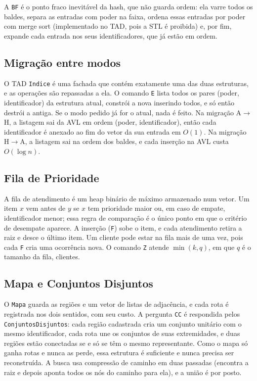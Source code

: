 \documentclass[letterpaper]{article} %
\begin{document}
A \texttt{BF} \'e o ponto fraco inevit\'avel da hash, que n\~ao guarda ordem: ela varre todos os baldes, separa as entradas com poder na faixa, ordena essas entradas por poder com merge sort (implementado no TAD, pois a STL \'e proibida) e, por fim, expande cada entrada nos seus identificadores, que j\'a est\~ao em ordem.

\subsection{Migra\c{c}\~ao entre modos}

O TAD \texttt{Indice} \'e uma fachada que cont\'em exatamente uma das duas estruturas, e as opera\c{c}\~oes s\~ao repassadas a ela. O comando \texttt{E} lista todos os pares (poder, identificador) da estrutura atual, constr\'oi a nova inserindo todos, e s\'o ent\~ao destr\'oi a antiga. Se o modo pedido j\'a for o atual, nada \'e feito. Na migra\c{c}\~ao A$\to$H, a listagem sai da AVL em ordem (poder, identificador), ent\~ao cada identificador \'e anexado ao fim do vetor da sua entrada em $O(1)$. Na migra\c{c}\~ao H$\to$A, a listagem sai na ordem dos baldes, e cada inser\c{c}\~ao na AVL custa $O(\log n)$.

\subsection{Fila de Prioridade}

A fila de atendimento \'e um heap bin\'ario de m\'aximo armazenado num vetor. Um item $x$ vem antes de $y$ se $x$ tem prioridade maior ou, em caso de empate, identificador menor; essa regra de compara\c{c}\~ao \'e o \'unico ponto em que o crit\'erio de desempate aparece. A inser\c{c}\~ao (\texttt{F}) sobe o item, e cada atendimento retira a raiz e desce o \'ultimo item. Um cliente pode estar na fila mais de uma vez, pois cada \texttt{F} cria uma ocorr\^encia nova. O comando \texttt{Z} atende $\min(k, q)$, em que $q$ \'e o tamanho da fila, clientes.

\subsection{Mapa e Conjuntos Disjuntos}

O \texttt{Mapa} guarda as regi\~oes e um vetor de listas de adjac\^encia, e cada rota \'e registrada nos dois sentidos, com seu custo. A pergunta \texttt{CC} \'e respondida pelos \texttt{ConjuntosDisjuntos}: cada regi\~ao cadastrada cria um conjunto unit\'ario com o mesmo identificador, cada rota une os conjuntos de suas extremidades, e duas regi\~oes est\~ao conectadas se e s\'o se t\^em o mesmo representante. Como o mapa s\'o ganha rotas e nunca as perde, essa estrutura \'e suficiente e nunca precisa ser reconstru\'ida. A busca usa compress\~ao de caminho em duas passadas (encontra a raiz e depois aponta todos os n\'os do caminho para ela), e a uni\~ao \'e por posto.
\end{document}
